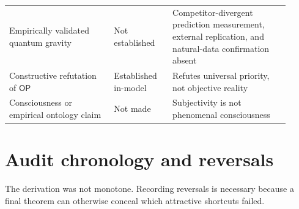 \documentclass[11pt]{article}
\theoremstyle{definition}
\theoremstyle{remark}
\newcommand{\OPT}{\mathsf{OP}}
\begin{document}
\begin{longtable}{>{\raggedright\arraybackslash}p{0.34\linewidth} >{\raggedright\arraybackslash}p{0.19\linewidth} >{\raggedright\arraybackslash}p{0.38\linewidth}}
Empirically validated quantum gravity & Not established & Competitor-divergent prediction measurement, external replication, and natural-data confirmation absent \\
Constructive refutation of $\OPT$ & Established in-model & Refutes universal priority, not objective reality \\
Consciousness or empirical ontology claim & Not made & Subjectivity is not phenomenal consciousness \\
\bottomrule
\end{longtable}

\section{Audit chronology and reversals}

The derivation was not monotone. Recording reversals is necessary because a final theorem can otherwise conceal which attractive shortcuts failed.
\end{document}
